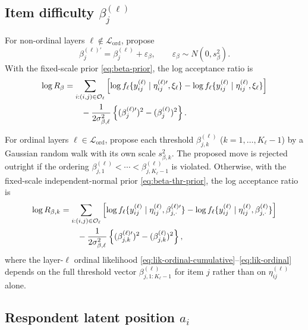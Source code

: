 \documentclass[11pt]{article}
\begin{document}
\subsection{Item difficulty $\beta_j^{(\ell)}$}

For non-ordinal layers $\ell\notin\mathcal L_{\mathrm{ord}}$, propose
\[
    \beta_j^{(\ell)\prime}
    =
    \beta_j^{(\ell)}+\varepsilon_\beta,
    \qquad
    \varepsilon_\beta\sim N(0,s_\beta^2).
\]
With the fixed-scale prior \eqref{eq:beta-prior}, the log acceptance ratio is
\begin{align}
    \log R_\beta
    &=
    \sum_{i:(i,j)\in\mathcal O_\ell}
    \left[
    \log f_\ell\{y_{ij}^{(\ell)}\mid \eta_{ij}^{(\ell)\prime},\xi_\ell\}
    -
    \log f_\ell\{y_{ij}^{(\ell)}\mid \eta_{ij}^{(\ell)},\xi_\ell\}
    \right]
    \notag\\
    &\qquad
    -\frac{1}{2\sigma_{\beta,\ell}^2}
    \left\{(\beta_j^{(\ell)\prime})^2-(\beta_j^{(\ell)})^2\right\}.
    \label{eq:beta-mh-ratio}
\end{align}

For ordinal layers $\ell\in\mathcal L_{\mathrm{ord}}$, propose each threshold
$\beta_{j,k}^{(\ell)}$ ($k=1,\dots,K_\ell-1$) by a Gaussian random walk with
its own scale $s_{\beta,k}^2$.  The proposed move is rejected outright if the
ordering $\beta_{j,1}^{(\ell)}<\cdots<\beta_{j,K_\ell-1}^{(\ell)}$ is
violated.  Otherwise, with the fixed-scale independent-normal prior
\eqref{eq:beta-thr-prior}, the log acceptance ratio is
\begin{align}
    \log R_{\beta,k}
    &=
    \sum_{i:(i,j)\in\mathcal O_\ell}
    \left[
    \log f_\ell\{y_{ij}^{(\ell)}\mid \eta_{ij}^{(\ell)},\beta_{j,\cdot}^{(\ell)\prime}\}
    -
    \log f_\ell\{y_{ij}^{(\ell)}\mid \eta_{ij}^{(\ell)},\beta_{j,\cdot}^{(\ell)}\}
    \right]
    \notag\\
    &\qquad
    -\frac{1}{2\sigma_{\beta,\ell}^2}
    \left\{(\beta_{j,k}^{(\ell)\prime})^2-(\beta_{j,k}^{(\ell)})^2\right\},
    \label{eq:beta-thr-mh-ratio}
\end{align}
where the layer-$\ell$ ordinal likelihood
\eqref{eq:lik-ordinal-cumulative}--\eqref{eq:lik-ordinal} depends on the full
threshold vector $\beta_{j,1:K_\ell-1}^{(\ell)}$ for item $j$ rather than on
$\eta_{ij}^{(\ell)}$ alone.

\subsection{Respondent latent position $a_i$}
\end{document}

